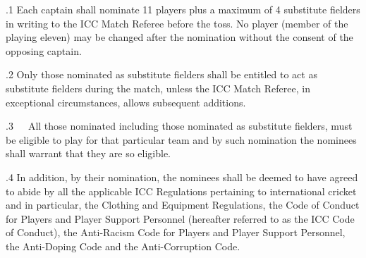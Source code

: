 \documentclass[12pt]{article}
\begin{document}
\vspace{\baselineskip}
\begin{adjustwidth}{0.5in}{0.12in}
{\fontsize{9pt}{10.8pt}.1 \tabto{0.49in} Each captain shall nominate 11 players plus a maximum of 4 substitute fielders in writing to the ICC Match Referee before the toss. No player (member of the playing eleven) may be changed after the nomination without the consent of the opposing captain.\par}\par

\end{adjustwidth}


\vspace{\baselineskip}
\begin{adjustwidth}{0.5in}{0.19in}
{\fontsize{9pt}{10.8pt}.2 \tabto{0.49in} Only those nominated as substitute fielders shall be entitled to act as substitute fielders during the match, unless the ICC Match Referee, in exceptional circumstances, allows subsequent additions.\par}\par

\end{adjustwidth}


\vspace{\baselineskip}
\begin{adjustwidth}{0.0in}{0.47in}
\begin{Center}
{\fontsize{9pt}{10.8pt}.3\ \ \  All those nominated including those nominated as substitute fielders, must be eligible to play for that particular team and by such nomination the nominees shall warrant that they are so eligible.\par}
\end{Center}\par

\end{adjustwidth}


\vspace{\baselineskip}
\begin{adjustwidth}{0.5in}{0.04in}
{\fontsize{9pt}{10.8pt}.4 \tabto{0.49in} In addition, by their nomination, the nominees shall be deemed to have agreed to abide by all the applicable ICC Regulations pertaining to international cricket and in particular, the Clothing and Equipment Regulations, the Code of Conduct for Players and Player Support Personnel (hereafter referred to as the ICC Code of Conduct), the Anti-Racism Code for Players and Player Support Personnel, the Anti-Doping Code and the Anti-Corruption Code.\par}\par

\end{adjustwidth}
\end{document}
